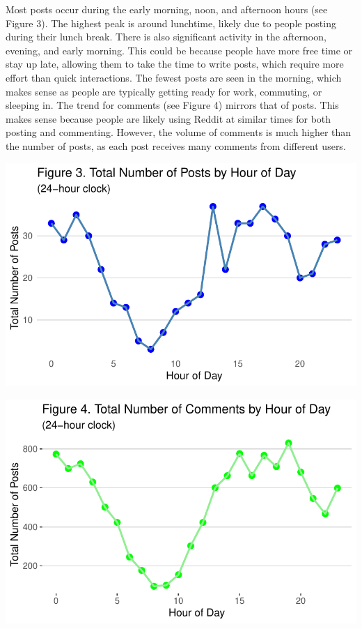 \documentclass[
  12pt]{article}
\begin{document}
Most posts occur during the early morning, noon, and afternoon hours
(see Figure 3). The highest peak is around lunchtime, likely due to
people posting during their lunch break. There is also significant
activity in the afternoon, evening, and early morning. This could be
because people have more free time or stay up late, allowing them to
take the time to write posts, which require more effort than quick
interactions. The fewest posts are seen in the morning, which makes
sense as people are typically getting ready for work, commuting, or
sleeping in. The trend for comments (see Figure 4) mirrors that of
posts. This makes sense because people are likely using Reddit at
similar times for both posting and commenting. However, the volume of
comments is much higher than the number of posts, as each post receives
many comments from different users.

\includegraphics{paper_files/figure-pdf/unnamed-chunk-5-1.pdf}

\includegraphics{paper_files/figure-pdf/unnamed-chunk-5-2.pdf}
\end{document}
